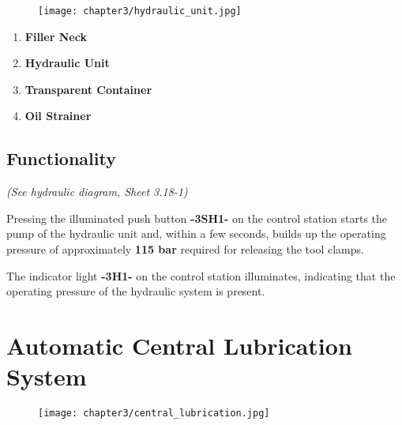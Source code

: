 \setcounter{page}{3}

\begin{figure}[h]
    \centering
    \texttt{[image: chapter3/hydraulic\_unit.jpg]}
    \label{fig:maho_hydraulic_unit}
\end{figure}

\begin{enumerate}
    \item \textbf{Filler Neck} \footnotemark
    \item \textbf{Hydraulic Unit}
    \item \textbf{Transparent Container}
    \item \textbf{Oil Strainer}
\end{enumerate}



\subsection{Functionality}  \footnotemark
{}

\textit{(See hydraulic diagram, Sheet 3.18-1)}

\noindent Pressing the illuminated push button \textbf{-3SH1-} on the control station starts the  
pump of the hydraulic unit and, within a few seconds, builds up the operating  
pressure of approximately \textbf{115 bar} required for releasing the tool clamps.  

\vspace{0.3cm}

\noindent The indicator light \textbf{-3H1-} on the control station illuminates, indicating  
that the operating pressure of the hydraulic system is present.

\section{Automatic Central Lubrication System}

\setcounter{section}{20}

\begin{figure}[h]
    \centering
    \texttt{[image: chapter3/central\_lubrication.jpg]}
    \label{fig:maho_central_lubrication}
\end{figure}

